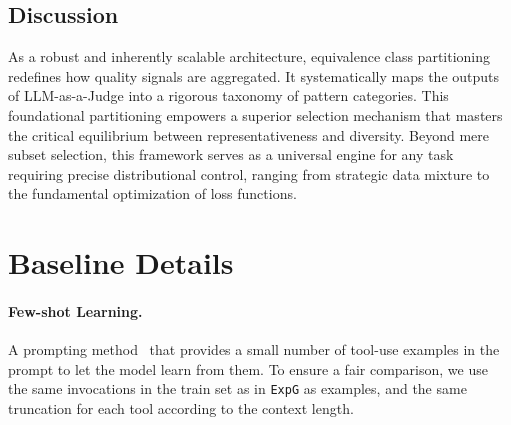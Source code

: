 \documentclass[11pt]{article}
\newcommand{\ours}{\texttt{ExpG}}
\begin{document}
\subsection{Discussion}
As a robust and inherently scalable architecture, equivalence class partitioning redefines how quality signals are aggregated. It systematically maps the outputs of LLM-as-a-Judge into a rigorous taxonomy of pattern categories. This foundational partitioning empowers a superior selection mechanism that masters the critical equilibrium between representativeness and diversity. Beyond mere subset selection, this framework serves as a universal engine for any task requiring precise distributional control, ranging from strategic data mixture to the fundamental optimization of loss functions. 

\section{Baseline Details}\label{app:baselines}
\paragraph{Few-shot Learning.} A prompting method~\cite{fewshot} that provides a small number of tool-use examples in the prompt to let the model learn from them. To ensure a fair comparison, we use the same invocations in the train set as in {\ours} as examples, and the same truncation for each tool according to the context length.
\end{document}
